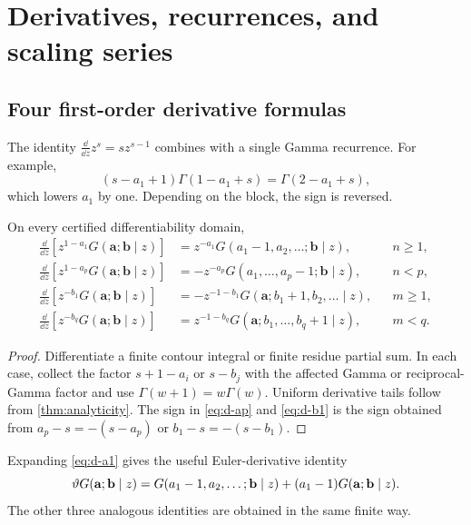 \section{Derivatives, recurrences, and scaling series}\label{sec:derivatives}

\subsection{Four first-order derivative formulas}

The identity $\frac{\dd}{\dd z}z^s=sz^{s-1}$ combines with a single Gamma
recurrence.  For example,
\[
 (s-a_1+1)\Gamma(1-a_1+s)=\Gamma(2-a_1+s),
\]
which lowers $a_1$ by one.  Depending on the block, the sign is reversed.

\begin{theorem}\label{thm:first-derivatives}
On every certified differentiability domain,
\begin{align}
\frac{\dd}{\dd z}\!
 \left[z^{1-a_1}G(\mathbf a;\mathbf b\mid z)\right]
&=z^{-a_1}G(a_1-1,a_2,\ldots;\mathbf b\mid z),&&n\ge1,
\label{eq:d-a1}\\
\frac{\dd}{\dd z}\!
 \left[z^{1-a_p}G(\mathbf a;\mathbf b\mid z)\right]
&=-z^{-a_p}G(a_1,\ldots,a_p-1;\mathbf b\mid z),&&n<p,
\label{eq:d-ap}\\
\frac{\dd}{\dd z}\!
 \left[z^{-b_1}G(\mathbf a;\mathbf b\mid z)\right]
&=-z^{-1-b_1}G(\mathbf a;b_1+1,b_2,\ldots\mid z),&&m\ge1,
\label{eq:d-b1}\\
\frac{\dd}{\dd z}\!
 \left[z^{-b_q}G(\mathbf a;\mathbf b\mid z)\right]
&=z^{-1-b_q}G(\mathbf a;b_1,\ldots,b_q+1\mid z),&&m<q.
\label{eq:d-bq}
\end{align}
\end{theorem}
\begin{proof}
Differentiate a finite contour integral or finite residue partial sum.  In each
case, collect the factor $s+1-a_i$ or $s-b_j$ with the affected Gamma or
reciprocal-Gamma factor and use $\Gamma(w+1)=w\Gamma(w)$.  Uniform derivative
tails follow from \cref{thm:analyticity}.  The sign in
\eqref{eq:d-ap} and \eqref{eq:d-b1} is the sign obtained from
$a_p-s=-(s-a_p)$ or $b_1-s=-(s-b_1)$.
\end{proof}

Expanding \eqref{eq:d-a1} gives the useful Euler-derivative identity
\begin{equation}\label{eq:theta-shift}
 \vartheta G(\mathbf a;\mathbf b\mid z)
 =G(a_1-1,a_2,\ldots;\mathbf b\mid z)+(a_1-1)G(\mathbf a;\mathbf b\mid z).
\end{equation}
The other three analogous identities are obtained in the same finite way.

